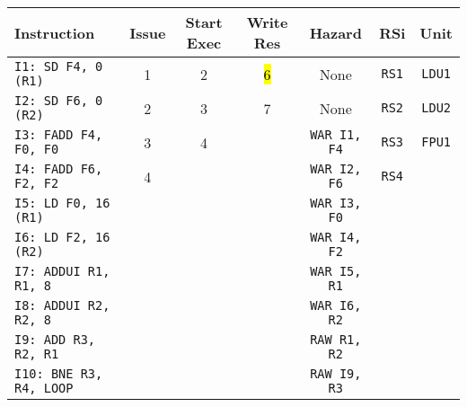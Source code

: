 \begin{enumerate}
    \begin{table}[!htp]
        \centering
        \begin{adjustbox}{width={\textwidth},totalheight={\textheight},keepaspectratio}
        \begin{tabular}{@{} l c c c c c c @{}}
            \toprule
            \textbf{Instruction} & \textbf{Issue} & \textbf{Start Exec} & \textbf{Write Res} & \textbf{Hazard} & \textbf{RSi} & \textbf{Unit} \\
            \midrule
            \texttt{I1: SD F4, 0 (R1)}      & 1 & 2 & \hl{6} & None  & \texttt{RS1}   & \texttt{LDU1}  \\ [.5em]
            \texttt{I2: SD F6, 0 (R2)}      & 2 & 3 & 7 & None  & \texttt{RS2}   & \texttt{LDU2}  \\ [.5em]
            \texttt{I3: FADD F4, F0, F0}    & 3 & 4 &   & \texttt{WAR I1, F4}  & \texttt{RS3} & \texttt{FPU1} \\ [.5em]
            \texttt{I4: FADD F6, F2, F2}    & 4 &   &   & \texttt{WAR I2, F6} & \texttt{RS4} &       \\ [.5em]
            \texttt{I5: LD F0, 16 (R1)}     &   &   &   & \texttt{WAR I3, F0} &       &       \\ [.5em]
            \texttt{I6: LD F2, 16 (R2)}     &   &   &   & \texttt{WAR I4, F2} &       &       \\ [.5em]
            \texttt{I7: ADDUI R1, R1, 8}    &   &   &   & \texttt{WAR I5, R1} &       &       \\ [.5em]
            \texttt{I8: ADDUI R2, R2, 8}    &   &   &   & \texttt{WAR I6, R2} &       &       \\ [.5em]
            \texttt{I9: ADD R3, R2, R1}     &   &   &   & \texttt{RAW R1, R2} &       &       \\ [.5em]
            \texttt{I10: BNE R3, R4, LOOP}   &   &   &   & \texttt{RAW I9, R3} &       &       \\
            \bottomrule
        \end{tabular}
        \end{adjustbox}
    \end{table}
    

\end{enumerate}
